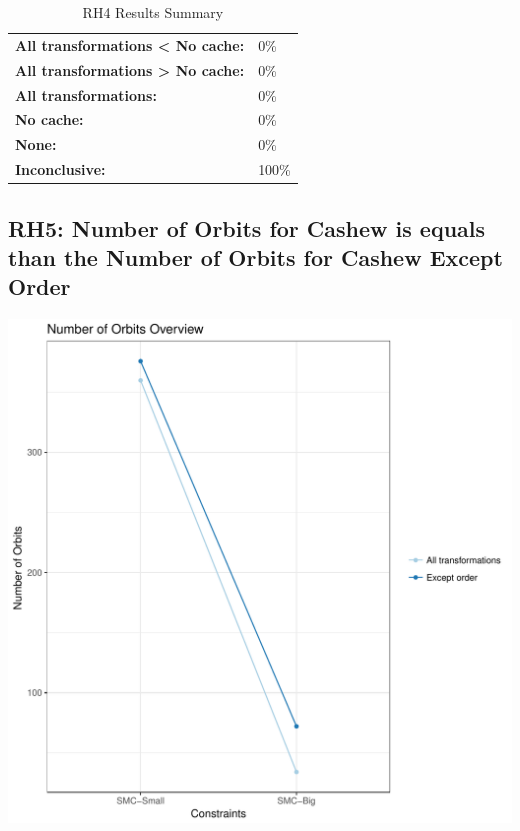 \documentclass{article}\usepackage[]{graphicx}\usepackage[]{color}
\makeatletter
\def\maxwidth{ %
  \ifdim\Gin@nat@width>\linewidth
    \linewidth
  \else
    \Gin@nat@width
  \fi
}
\newenvironment{knitrout}{}{} %
\makeatother
\begin{document}
	\begin{table}[H]
	\centering
	\caption{RH4 Results Summary}
	\begin{tabular}{ll}
	\textbf{All transformations \textless{} No cache:}& 0\% \\
	\textbf{All transformations \textgreater{} No cache:}& 0\%\\
	\textbf{All transformations:} & 0\%\\
	\textbf{No cache:} & 0\%\\
	\textbf{None:}& 0\%\\
	\textbf{Inconclusive:}& 100\%
			
	
	\end{tabular}
	\end{table}
	
	
	



\subsection{RH5: Number of Orbits for Cashew is equals than the Number of Orbits for Cashew Except Order}


 
\begin{knitrout}
\color{fgcolor}
\includegraphics[width=\maxwidth]{figure/overview_RH5-1} 

\end{knitrout}
 	
\end{document}
